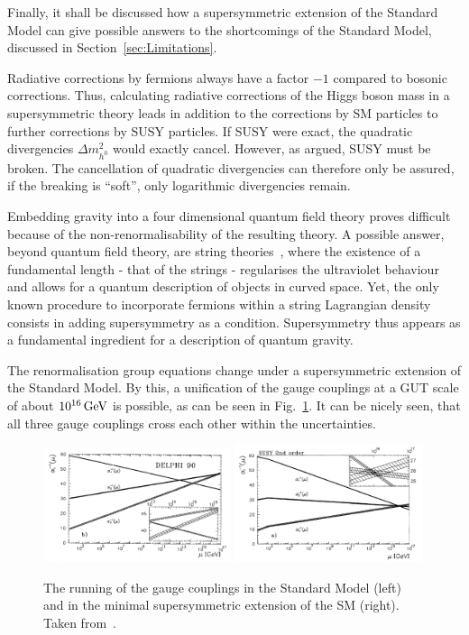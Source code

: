 Finally, it shall be discussed how a supersymmetric extension of the Standard Model can give possible answers to the shortcomings of the Standard Model, discussed in Section~\ref{sec:Limitations}.

Radiative corrections by fermions always have a factor $-1$ compared to bosonic corrections.
Thus, calculating radiative corrections of the Higgs boson mass in a supersymmetric theory leads in addition to the corrections by SM particles to further corrections by SUSY particles.
If SUSY were exact, the quadratic divergencies $\Delta m^2_{h^0}$ would exactly cancel. 
However, as argued, SUSY must be broken.
The cancellation of quadratic divergencies can therefore only be assured, if the breaking is ``soft'', \ie only logarithmic divergencies remain.

Embedding gravity into a four dimensional quantum field theory proves difficult because of the non-renormalisability of the resulting theory.
A possible answer, beyond quantum field theory, are string theories~\cite{bib:Strings_1974}, where the existence of a fundamental length - that of the strings - regularises the ultraviolet behaviour and allows for a quantum description of objects in curved space.
Yet, the only known procedure to incorporate fermions within a string Lagrangian density consists in adding supersymmetry as a condition. 
Supersymmetry thus appears as a fundamental ingredient for a description of quantum gravity.

The renormalisation group equations change under a supersymmetric extension of the Standard Model.
By this, a unification of the gauge couplings at a GUT scale of about $10^{16}\,\text{Ge}\kern-0.06667em\text{V}$ is possible, as can be seen in Fig.~\ref{fig:Unification}.
It can be nicely seen, that all three gauge couplings cross each other within the uncertainties.
\begin{figure}[!t]
  \centering
      \includegraphics[width=0.49\textwidth]{figures/theory/running_couplings_SM}
      \includegraphics[width=0.49\textwidth]{figures/theory/running_couplings_MSSM}
  \caption{The running of the gauge couplings in the Standard Model (left) and in the minimal supersymmetric extension of the SM (right). Taken from~\cite{bib:Unification}.}  
  \label{fig:Unification}
\end{figure}

